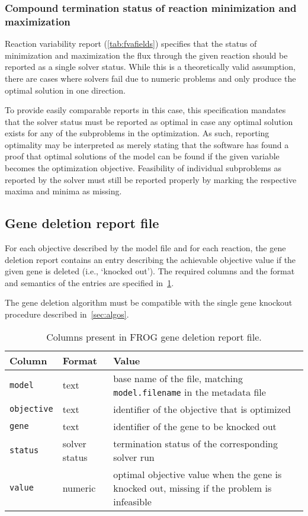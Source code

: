 \subsubsection{Compound termination status of reaction minimization and maximization}
\label{sec:fvastatus}

Reaction variability report (\cref{tab:fvafields}) specifies that the status of minimization and maximization the flux through the given reaction should be reported as a single solver status.
While this is a theoretically valid assumption, there are cases where solvers fail due to numeric problems and only produce the optimal solution in one direction.

To provide easily comparable reports in this case, this specification mandates that the solver status must be reported as optimal in case any optimal solution exists for any of the subproblems in the optimization.
As such, reporting optimality may be interpreted as merely stating that the software has found a proof that optimal solutions of the model can be found if the given variable becomes the optimization objective.
Feasibility of individual subproblems as reported by the solver must still be reported properly by marking the respective maxima and minima as missing.

\subsection{Gene deletion report file}
\label{sec:genes}

For each objective described by the model file and for each reaction, the gene deletion report contains an entry describing the achievable objective value if the given gene is deleted (i.e., `knocked out'). The required columns and the format and semantics of the entries are specified in~\cref{tab:genefields}.

The gene deletion algorithm must be compatible with the single gene knockout procedure described in~\cref{sec:algos}.

\begin{table}\tablefont
\begin{tabular}{llp{30em}}
\toprule
Column & Format & Value \\
\midrule
\verb|model|
 & text
 & base name of the file, matching \verb|model.filename| in the metadata file
 \\
\verb|objective|
 & text
 & identifier of the objective that is optimized
 \\
\verb|gene|
 & text
 & identifier of the gene to be knocked out
 \\
\verb|status|
 & solver status
 & termination status of the corresponding solver run
 \\
\verb|value|
 & numeric
 & optimal objective value when the gene is knocked out, missing if the problem is infeasible
 \\
\bottomrule
\end{tabular}
\caption{Columns present in FROG gene deletion report file.}
\label{tab:genefields}
\end{table}

